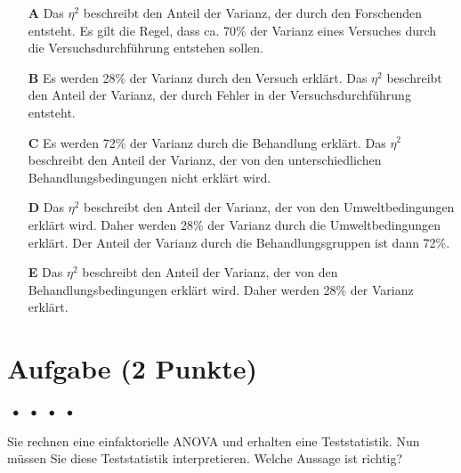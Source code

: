 \documentclass[a4paper, 9pt]{scrartcl}\usepackage[]{graphicx}\usepackage[]{xcolor}
\begin{document}
\begin{enumerate}
\item [\textbf{A} \msquare] Das $\eta^2$ beschreibt den Anteil der Varianz, der durch den Forschenden entsteht. Es gilt die Regel, dass ca. 70\% der Varianz eines Versuches durch die Versuchsdurchführung entstehen sollen.
\item [\textbf{B} \msquare] Es werden 28\% der Varianz durch den Versuch erklärt. Das $\eta^2$ beschreibt den Anteil der Varianz, der durch Fehler in der Versuchsdurchführung entsteht.
\item [\textbf{C} \msquare] Es werden 72\% der Varianz durch die Behandlung erklärt. Das $\eta^2$ beschreibt den Anteil der Varianz, der von den unterschiedlichen Behandlungsbedingungen nicht erklärt wird.
\item [\textbf{D} \msquare] Das $\eta^2$ beschreibt den Anteil der Varianz, der von den Umweltbedingungen erklärt wird. Daher werden 28\% der Varianz durch die Umweltbedingungen erklärt. Der Anteil der Varianz durch die Behandlungsgruppen ist dann 72\%.
\item [\textbf{E} \msquare] Das $\eta^2$ beschreibt den Anteil der Varianz, der von den Behandlungsbedingungen erklärt wird. Daher werden 28\% der Varianz erklärt.
\end{enumerate}

\section{Aufgabe \hfill (2 Punkte)}

\ifcollection
\begin{flushright}
\tiny\vspace{-2Ex}
\textbf{\examinhaltstart}
\exammodulemathstat $\;\bullet$
\exammodulestat $\;\bullet$
\exammodulestatbbv $\;\bullet$
\exammodulestatversuch $\;\bullet$
\exammodulebiostat
\vspace{-1Ex}
\end{flushright}
\fi




Sie rechnen eine einfaktorielle ANOVA und erhalten eine Teststatistik. Nun müssen Sie diese Teststatistik interpretieren. Welche Aussage ist richtig?
\end{document}
